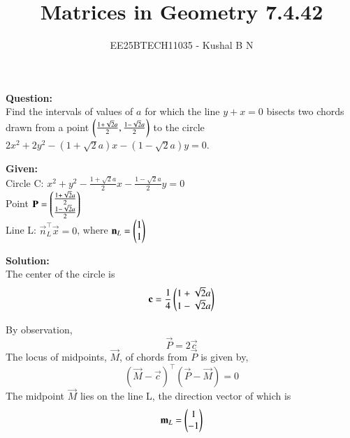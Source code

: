 \documentclass[journal,12pt,onecolumn]{IEEEtran}
\title{Matrices in Geometry 7.4.42}
\author{EE25BTECH11035 - Kushal B N}
\theoremstyle{remark}
\begin{document}
\vspace{3cm}
\maketitle
{\let\newpage\relax\maketitle}

\textbf{Question: }\\
Find the intervals of values of $a$ for which the line $y+x = 0$ bisects two chords drawn from a point $\left(\frac{1+\sqrt{2}a}{2},\frac{1-\sqrt{2}a}{2}\right)$ to the circle $2x^2 + 2y^2 - (1+\sqrt{2}a)x - (1-\sqrt{2}a)y = 0$.

\vspace{0.5cm}

\textbf{Given: } \\
Circle C: $x^2 + y^2 - \frac{1+\sqrt{2}a}{2}x - \frac{1-\sqrt{2}a}{2}y = 0$\\
Point $\mathbf{P} = \begin{pmatrix}\frac{1+\sqrt{2}a}{2}\\\frac{1-\sqrt{2}a}{2}\end{pmatrix}$\\
Line L: $\vec{n}_L^{\top}\vec{x} = 0$, where $\mathbf{n}_L = \begin{pmatrix}1\\1\end{pmatrix}$

\vspace{0.5cm}

\textbf{Solution: }\\
The center of the circle is 
\begin{equation}
\mathbf{c} = \frac{1}{4}\begin{pmatrix}1+\sqrt{2}a\\1-\sqrt{2}a\end{pmatrix}
\end{equation}
    
By observation,
\begin{equation}
    \vec{P} = 2\vec{c}
\end{equation}
The locus of midpoints, $\vec{M}$, of chords from $\vec{P}$ is given by,
\begin{equation}
    (\vec{M}-\vec{c})^{\top}(\vec{P}-\vec{M}) = 0
    \label{eq3}
\end{equation}
The midpoint $\vec{M}$ lies on the line L, the direction vector of which is
\begin{equation}
    \mathbf{m}_L = \begin{pmatrix}1\\-1\end{pmatrix}
\end{equation}
\end{document}
